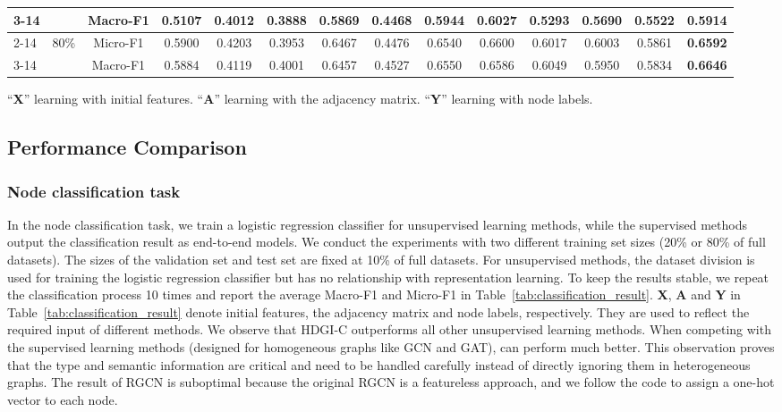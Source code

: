 \documentclass[conference]{IEEEtran}
\begin{document}
\begin{table*}[thb!]
\begin{threeparttable}
\begin{tabular}{l|c|c| c| c c|cccc| cccc }
				\cmidrule(l){3-14}
				& & Macro-F1 & 0.5107 & 0.4012 & 0.3888 & 0.5869 &0.4468 & 0.5944 & 0.6027 & 0.5293 & 0.5690 & 0.5522 & \textbf{0.5914} \\
				\cmidrule(l){2-14}
				& \multirow{2}{*}{80\%} & Micro-F1 & 0.5900 & 0.4203 & 0.3953  & 0.6467 &0.4476& 0.6540 & 0.6600 & 0.6017 & 0.6003 & 0.5861 & \textbf{0.6592}\\
				\cmidrule(l){3-14}
				&& Macro-F1 & 0.5884 & 0.4119 & 0.4001  & 0.6457 &0.4527 & 0.6550 & 0.6586 & 0.6049 & 0.5950 & 0.5834 & \textbf{0.6646}\\
\bottomrule
			\end{tabular}


			\begin{tablenotes}
				\item``\textbf{X}'' learning with initial features. ``\textbf{A}'' learning with the adjacency matrix. ``\textbf{Y}'' learning with node labels.
			\end{tablenotes}
		\end{threeparttable}\label{tab:classification_result}
\end{table*}
	\subsection{Performance Comparison}


	\subsubsection{Node classification task}
In the node classification task, we train a logistic regression classifier for unsupervised learning methods, while the supervised methods output the classification result as end-to-end models. We conduct the experiments with two different training set sizes (20\% or 80\% of full datasets). The sizes of the validation set and test set are fixed at 10\% of full datasets. For unsupervised methods, the dataset division is used for training the logistic regression classifier but has no relationship with representation learning. To keep the results stable, we repeat the classification process 10 times and report the average Macro-F1 and Micro-F1 in Table~\ref{tab:classification_result}. \textbf{X}, \textbf{A} and \textbf{Y} in Table~\ref{tab:classification_result} denote initial features, the adjacency matrix and node labels, respectively. They are used to reflect the required input of different methods. We observe that HDGI-C outperforms all other unsupervised learning methods. When competing with the supervised learning methods (designed for homogeneous graphs like GCN and GAT), {\our} can perform much better. This observation proves that the type and semantic information are critical and need to be handled carefully instead of directly ignoring them in heterogeneous graphs. The result of RGCN is suboptimal because the original RGCN is a featureless approach, and we follow the code to assign a one-hot vector to each node.
	
\end{document}
